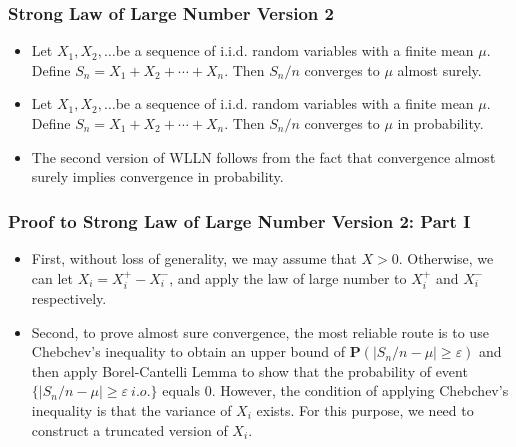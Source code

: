 \documentclass[handout]{beamer}
\newcommand{\BP}{\mathbf{P}}
\begin{document}
\frame
{
  \frametitle{Strong Law of Large Number Version 2}

   \begin{itemize}
   \item<1->[]   \begin{Theorem}[SLLN V2] Let $X_1, X_2,\ldots$be a sequence of i.i.d. random variables with a finite mean $\mu$. Define $S_n=X_1+X_2+\cdots +X_n$. Then $S_n/n$ converges to $\mu$ almost surely.
      
   \end{Theorem}
   
      \item<2->[]   \begin{Corollary} Let $X_1, X_2,\ldots$be a sequence of i.i.d. random variables with a finite mean $\mu$. Define $S_n=X_1+X_2+\cdots +X_n$. Then $S_n/n$ converges to $\mu$ in probability.
      
   \end{Corollary}
      
      
      \item<3->[] The second version of WLLN follows from the fact that convergence almost surely implies convergence in probability. 
      
                 
                                      
\end{itemize}
}


\frame
{
  \frametitle{Proof to Strong Law of Large Number Version 2: Part I}

   \begin{itemize}
   \item<1-> First, without loss of generality, we may assume that $X>0$. Otherwise, we can let $X_i=X_i^+-X_i^-$, and apply the law of large number to $X_i^+$ and $X_i^-$ respectively. 
   
      \item<2->[-] Second, to prove almost sure convergence, the most reliable route is to use Chebchev's inequality to obtain an upper bound of $\BP( |S_n/n-\mu|\geq \varepsilon)$ and then apply  Borel-Cantelli Lemma to show that the probability of event $\{|S_n/n-\mu|\geq \varepsilon\ i.o.\}$ equals 0. However, the condition of applying Chebchev's inequality is that the variance of $X_i$ exists. For this purpose, we need to construct a truncated version of $X_i$. 
                                            
\end{itemize}
}
\end{document}
